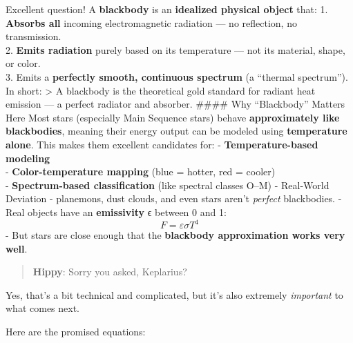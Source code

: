 \documentclass[
  letterpaper,
]{book}
\begin{document}
Excellent question! A \textbf{blackbody} is an \textbf{idealized
physical object} that: 1. \textbf{Absorbs all} incoming electromagnetic
radiation --- no reflection, no transmission.\\
2. \textbf{Emits radiation} purely based on its temperature --- not its
material, shape, or color.\\
3. Emits a \textbf{perfectly smooth, continuous spectrum} (a ``thermal
spectrum''). In short: \textgreater{} A blackbody is the theoretical
gold standard for radiant heat emission --- a perfect radiator and
absorber. \#\#\#\# Why ``Blackbody'' Matters Here Most stars (especially
Main Sequence stars) behave \textbf{approximately like blackbodies},
meaning their energy output can be modeled using \textbf{temperature
alone}. This makes them excellent candidates for: -
\textbf{Temperature-based modeling}\\
- \textbf{Color-temperature mapping} (blue = hotter, red = cooler)\\
- \textbf{Spectrum-based classification} (like spectral classes O--M) -
Real-World Deviation - planemons, dust clouds, and even stars aren't
\emph{perfect} blackbodies. - Real objects have an \textbf{emissivity} ϵ
between 0 and 1: \[ F = \varepsilon \sigma T^4\] - But stars are close
enough that the \textbf{blackbody approximation works very well}.

\begin{quote}
\textbf{Hippy}: Sorry you asked, Keplarius?
\end{quote}

Yes, that's a bit technical and complicated, but it's also extremely
\emph{important} to what comes next.

Here are the promised equations:
\end{document}
